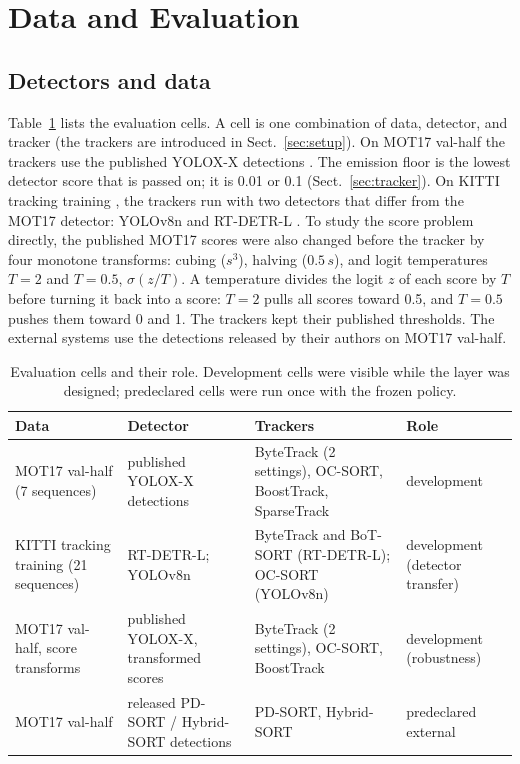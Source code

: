 \documentclass[pdflatex,sn-mathphys-num,iicol]{sn-jnl}
\begin{document}
\section{Data and Evaluation}\label{sec:data-eval}

\subsection{Detectors and data}\label{sec:data}
Table~\ref{tab:data} lists the evaluation cells. A cell is one combination of
data, detector, and tracker (the trackers are introduced in
Sect.~\ref{sec:setup}). On MOT17 val-half \cite{milan2016mot16} the trackers
use the published YOLOX-X detections \cite{ge2021yolox}. The emission floor is
the lowest detector score that is passed on; it is 0.01 or 0.1
(Sect.~\ref{sec:tracker}). On KITTI tracking training \cite{geiger2012kitti},
the trackers run with two detectors that differ from the MOT17 detector:
YOLOv8n \cite{jocher2023yolov8} and RT-DETR-L \cite{zhao2024rtdetr}. To study
the score problem directly, the published MOT17 scores were also changed
before the tracker by four monotone transforms: cubing ($s^3$), halving ($0.5\,s$),
and logit temperatures $T=2$ and $T=0.5$, $\sigma(z/T)$. A temperature
divides the logit $z$ of each score by $T$ before turning it back into a
score: $T=2$ pulls all scores toward 0.5, and $T=0.5$ pushes them toward 0
and 1. The trackers kept their published thresholds. The external systems use the detections released
by their authors on MOT17 val-half.

\begin{table}[t]
\caption{Evaluation cells and their role. Development cells were visible while
the layer was designed; predeclared cells were run once with the frozen
policy.}
\label{tab:data}
\centering\footnotesize
\setlength{\tabcolsep}{4pt}
\begin{tabular}{@{}>{\raggedright\arraybackslash}p{36mm}>{\raggedright\arraybackslash}p{32mm}>{\raggedright\arraybackslash}p{50mm}>{\raggedright\arraybackslash}p{30mm}@{}}
\toprule
Data & Detector & Trackers & Role\\
\midrule
MOT17 val-half (7 sequences) & published YOLOX-X detections & ByteTrack (2 settings), OC-SORT, BoostTrack, SparseTrack & development\\
KITTI tracking training (21 sequences) & RT-DETR-L; YOLOv8n & ByteTrack and BoT-SORT (RT-DETR-L); OC-SORT (YOLOv8n) & development (detector transfer)\\
MOT17 val-half, score transforms & published YOLOX-X, transformed scores & ByteTrack (2 settings), OC-SORT, BoostTrack & development (robustness)\\
MOT17 val-half & released PD-SORT / Hybrid-SORT detections & PD-SORT, Hybrid-SORT & predeclared external\\
\bottomrule
\end{tabular}
\end{table}
\end{document}
